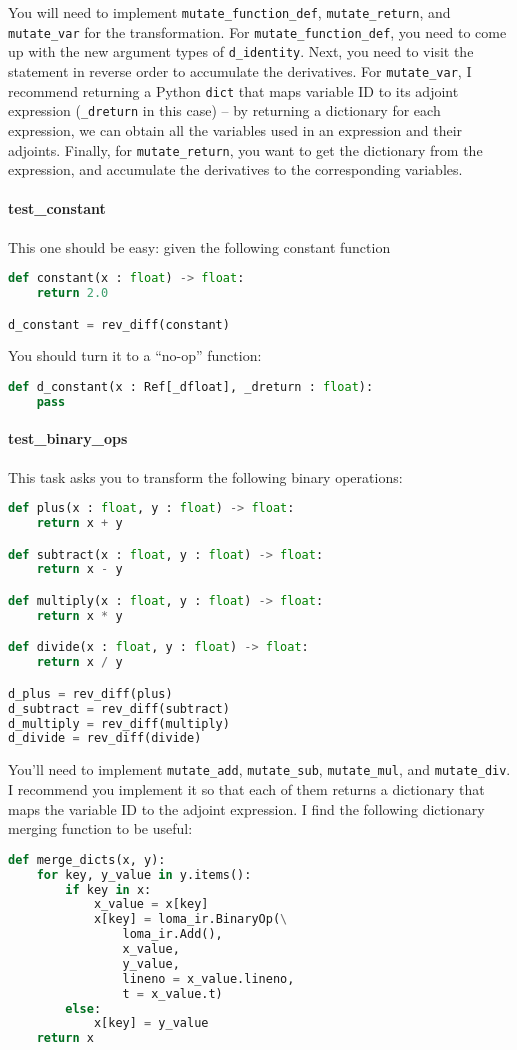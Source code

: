 You will need to implement \lstinline{mutate_function_def}, \lstinline{mutate_return}, and \lstinline{mutate_var} for the transformation. For \lstinline{mutate_function_def}, you need to come up with the new argument types of \lstinline{d_identity}. Next, you need to visit the statement in reverse order to accumulate the derivatives. For \lstinline{mutate_var}, I recommend returning a Python \lstinline{dict} that maps variable ID to its adjoint expression (\lstinline{_dreturn} in this case) -- by returning a dictionary for each expression, we can obtain all the variables used in an expression and their adjoints. Finally, for \lstinline{mutate_return}, you want to get the dictionary from the expression, and accumulate the derivatives to the corresponding variables. 

\paragraph{test_constant} This one should be easy: given the following constant function
\begin{lstlisting}[language=Python]
def constant(x : float) -> float:
    return 2.0

d_constant = rev_diff(constant)
\end{lstlisting}
You should turn it to a ``no-op'' function:
\begin{lstlisting}[language=Python]
def d_constant(x : Ref[_dfloat], _dreturn : float):
	pass
\end{lstlisting}

\paragraph{test_binary_ops} This task asks you to transform the following binary operations:
\begin{lstlisting}[language=Python]
def plus(x : float, y : float) -> float:
    return x + y

def subtract(x : float, y : float) -> float:
    return x - y

def multiply(x : float, y : float) -> float:
    return x * y

def divide(x : float, y : float) -> float:
    return x / y

d_plus = rev_diff(plus)
d_subtract = rev_diff(subtract)
d_multiply = rev_diff(multiply)
d_divide = rev_diff(divide)
\end{lstlisting}

You'll need to implement \lstinline{mutate_add}, \lstinline{mutate_sub}, \lstinline{mutate_mul}, and \lstinline{mutate_div}. I recommend you implement it so that each of them returns a dictionary that maps the variable ID to the adjoint expression. I find the following dictionary merging function to be useful:
\begin{lstlisting}[language=Python]
def merge_dicts(x, y):
    for key, y_value in y.items():
        if key in x:
            x_value = x[key]
            x[key] = loma_ir.BinaryOp(\
                loma_ir.Add(),
                x_value,
                y_value,
                lineno = x_value.lineno,
                t = x_value.t)
        else:
            x[key] = y_value
    return x
\end{lstlisting}


